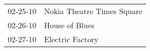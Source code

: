 \begin{supertabular}{p{0.07\textwidth}p{0.23\textwidth}}
 02-25-10 &  Nokia Theatre Times Square \\
 02-26-10 &              House of Blues \\
 02-27-10 &            Electric Factory \\
\end{supertabular}
